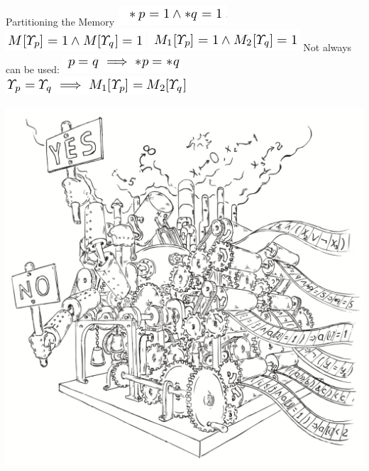 \documentclass{beamer}
\begin{document}
\begin{frame}{Partitioning the Memory}
\includegraphics[scale=0.5]{partitioning1.png}\newline
\includegraphics[scale=0.5]{partitioning2.png}\newline
\includegraphics[scale=0.5]{partitioning3.png}\newline
Not always can be used:\newline
\includegraphics[scale=0.5]{partitioning4.png}\newline
\includegraphics[scale=0.5]{partitioning5.png}\newline
\end{frame}

\begin{frame}
\includegraphics[scale=0.5]{../decision-procedure.png}
\end{frame}
\end{document}
